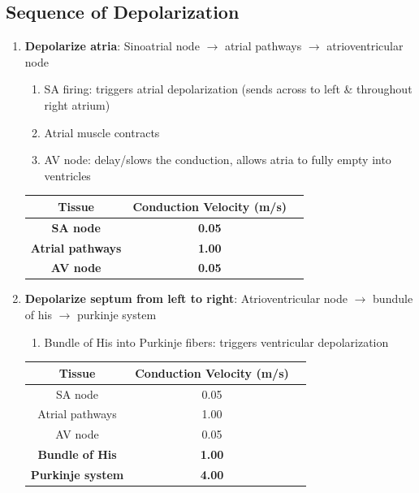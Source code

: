 \documentclass[11pt,fleqn]{book}
\begin{document}
\subsection{Sequence of Depolarization}
\begin{enumerate}
    \item \textbf{Depolarize atria}: Sinoatrial node $\rightarrow$ atrial pathways $\rightarrow$ atrioventricular node
    \begin{enumerate}[start=1]
        \item SA firing: triggers atrial
depolarization (sends
across to left \& throughout
right atrium)
        \item Atrial muscle contracts
        \item AV node: delay/slows
the conduction, allows
atria to fully empty into
ventricles
    \end{enumerate}

\begin{tabular}{ccc}
\textbf{Tissue}  & \textbf{Conduction Velocity (m/s)} \\
\hline
\textbf{SA node}                                  & \textbf{0.05} \\
\textbf{Atrial pathways    }                      & \textbf{1.00} \\
\textbf{AV node     }                             & \textbf{0.05} 
\end{tabular}

    \item \textbf{Depolarize septum from left to right}: Atrioventricular node $\rightarrow$ bundule of his $\rightarrow$ purkinje system
    \begin{enumerate}[start=4]
        \item Bundle of His into
Purkinje fibers: triggers
ventricular
depolarization
    \end{enumerate}

\begin{tabular}{ccc}
\textbf{Tissue}  & \textbf{Conduction Velocity (m/s)} \\
\hline
SA node                                  & 0.05 \\
Atrial pathways                          & 1.00 \\
AV node                                  & 0.05 \\
\textbf{Bundle of His}&\textbf{1.00}\\
\textbf{Purkinje system}&\textbf{4.00}
\end{tabular}


\end{enumerate}
\end{document}
